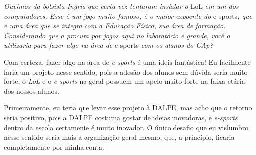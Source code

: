 \textit{Ouvimos da bolsista Ingrid que certa vez tentaram instalar o} LoL \textit{em um dos computadores. Esse é um jogo muito famoso, é o maior expoente do} e-sports\textit{, que é uma área que se integra com a Educação Física, sua área de formação. Considerando que a procura por jogos aqui no laboratório é grande, você o utilizaria para fazer algo na área de} e-sports \textit{com os alunos do CAp?}

Com certeza, fazer algo na área de \textit{e-sports} é uma ideia fantástica! Eu facilmente faria um projeto nesse sentido, pois a adesão dos alunos sem dúvida seria muito forte, o \textit{LoL} e o \textit{e-sports} no geral possuem um apelo muito forte na faixa etária dos nossos alunos.

Primeiramente, eu teria que levar esse projeto à DALPE, mas acho que o retorno seria positivo, pois a DALPE costuma gostar de ideias inovadoras, e \textit{e-sports} dentro da escola certamente é muito inovador. O único desafio que eu vislumbro nesse sentido seria mais a organização geral mesmo, que, a princípio, ficaria completamente por minha conta.
